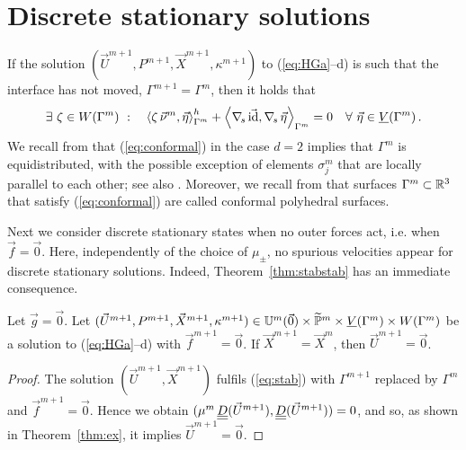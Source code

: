 \section{Discrete stationary solutions}\label{sec:stokes_stationary_solution}
If the solution $(\vec U^{m+1},P^{m+1},\vec X^{m+1}, \kappa^{m+1})$ to
(\ref{eq:HGa}--d) is such that the interface has not moved,
$\Gamma^{m+1} = \Gamma^m$, then it holds that
\begin{equation}\label{eq:conformal}
\exists\ \zeta \in W(\Gamma^m) \ : \quad \left\langle \zeta\,\vec\nu^m, \vec\eta
\right\rangle_{\Gamma^m}^h + \left\langle \nabla_{\!s}\,\vec {\rm id}, \nabla_{\!s}\,\vec \eta
\right\rangle_{\Gamma^m} = 0 \quad \forall\ \vec\eta \in \underline{V}(\Gamma^m) \,.
\end{equation}
We recall from \cite[Remark~2.4]{triplej} that (\ref{eq:conformal}) in the
case $d=2$ implies that $\Gamma^m$ is equidistributed, with the possible
exception of
elements $\sigma^m_j$ that are locally parallel to each other; see also
\cite[Theorem~2.2]{fdfi}.
Moreover, we recall from \cite[\S4.1]{gflows3d}
that surfaces $\Gamma^m \subset \mathbb R^3$
that satisfy (\ref{eq:conformal}) are called conformal polyhedral surfaces.

Next we consider discrete stationary states when no outer forces act, i.e. when
$\vec f = \vec 0$. Here, independently of the choice of $\mu_\pm$, no spurious
velocities appear for discrete stationary solutions. Indeed,
Theorem~\ref{thm:stabstab} has an immediate consequence.
\begin{theorem}\label{thm:stat1}
Let $\vec g=\vec 0$. Let $(\vec U^{m+1},P^{m+1},\vec X^{m+1}, \kappa^{m+1})
\in \mathbb{U}^{m}(\vec{0})\times
\widetilde{\mathbb{P}}^m \times \underline{V}(\Gamma^m) \times W(\Gamma^m)$ be a solution to  (\ref{eq:HGa}--d) with
$\vec f^{m+1} = \vec 0$. If $\vec X^{m+1} = \vec X^m$, then $\vec U^{m+1} = \vec
0$.
\end{theorem}
\begin{proof}
The solution $(\vec U^{m+1}, \vec X^{m+1})$ fulfils (\ref{eq:stab}) with
$\Gamma^{m+1}$ replaced by $\Gamma^m$ and  $\vec f^{m+1} = \vec 0$. Hence we
obtain $(\mu^m\,\mat D (\vec U^{m+1}), \mat D(\vec U^{m+1})) = 0$, and so, as
shown in Theorem~\ref{thm:ex}, it implies $\vec U^{m+1} = \vec 0$.
\end{proof}

